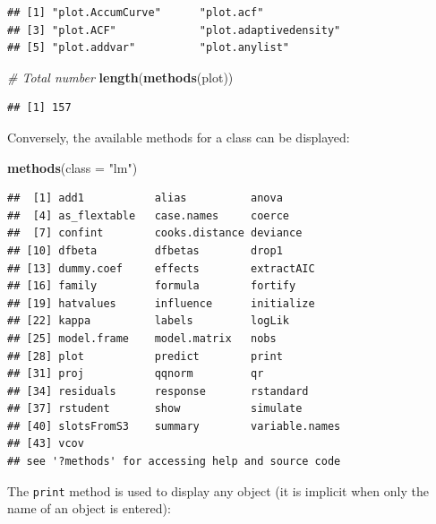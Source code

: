 \documentclass[
  12pt,
  american,
  a4paper,
  extrafontsizes,onecolumn,openright
  ]{memoir}
\newenvironment{Shaded}{\begin{snugshade}}{\end{snugshade}}
\newcommand{\AttributeTok}[1]{\textcolor[rgb]{0.13,0.29,0.53}{#1}}
\newcommand{\CommentTok}[1]{\textcolor[rgb]{0.56,0.35,0.01}{\textit{#1}}}
\newcommand{\FunctionTok}[1]{\textcolor[rgb]{0.13,0.29,0.53}{\textbf{#1}}}
\newcommand{\NormalTok}[1]{#1}
\newcommand{\StringTok}[1]{\textcolor[rgb]{0.31,0.60,0.02}{#1}}
\begin{document}
\begin{verbatim}
## [1] "plot.AccumCurve"      "plot.acf"            
## [3] "plot.ACF"             "plot.adaptivedensity"
## [5] "plot.addvar"          "plot.anylist"
\end{verbatim}

\begin{Shaded}
\begin{Highlighting}[]
\CommentTok{\# Total number}
\FunctionTok{length}\NormalTok{(}\FunctionTok{methods}\NormalTok{(plot))}
\end{Highlighting}
\end{Shaded}

\begin{verbatim}
## [1] 157
\end{verbatim}

\normalsize

Conversely, the available methods for a class can be displayed:

\scriptsize

\begin{Shaded}
\begin{Highlighting}[]
\FunctionTok{methods}\NormalTok{(}\AttributeTok{class =} \StringTok{"lm"}\NormalTok{)}
\end{Highlighting}
\end{Shaded}

\begin{verbatim}
##  [1] add1           alias          anova         
##  [4] as_flextable   case.names     coerce        
##  [7] confint        cooks.distance deviance      
## [10] dfbeta         dfbetas        drop1         
## [13] dummy.coef     effects        extractAIC    
## [16] family         formula        fortify       
## [19] hatvalues      influence      initialize    
## [22] kappa          labels         logLik        
## [25] model.frame    model.matrix   nobs          
## [28] plot           predict        print         
## [31] proj           qqnorm         qr            
## [34] residuals      response       rstandard     
## [37] rstudent       show           simulate      
## [40] slotsFromS3    summary        variable.names
## [43] vcov          
## see '?methods' for accessing help and source code
\end{verbatim}

\normalsize

The \texttt{print} method is used to display any object (it is implicit when only the name of an object is entered):

\scriptsize
\end{document}
